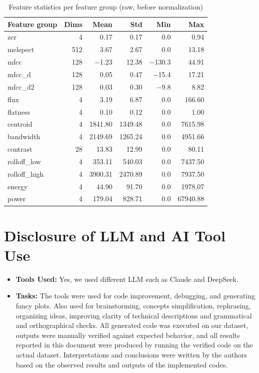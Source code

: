 \documentclass{article}
\begin{document}
\begin{table}[!h]
  \caption{Feature statistics per feature group (raw, before normalization)}
  \label{tab:featstats}
  \centering
  \small
  \begin{tabular}{lrrrrr}
    \toprule
    Feature group & Dims & Mean & Std & Min & Max \\
    \midrule
    zcr           &   4 & 0.17    & 0.17     & 0.0   & 0.94 \\
    melspect      & 512 & 3.67    & 2.67     & 0.0   & 13.18 \\
    mfcc          & 128 & $-$1.23 & 12.38    & $-$130.3 & 44.91 \\
    mfcc\_d       & 128 & 0.05    & 0.47     & $-$15.4 & 17.21 \\
    mfcc\_d2      & 128 & 0.03    & 0.30     & $-$9.8  & 8.82 \\
    flux          &   4 & 3.19    & 6.87     & 0.0   & 166.60 \\
    flatness      &   4 & 0.10    & 0.12     & 0.0   & 1.00 \\
    centroid      &   4 & 1841.80 & 1349.48  & 0.0   & 7615.98 \\
    bandwidth     &   4 & 2149.69 & 1265.24  & 0.0   & 4951.66 \\
    contrast      &  28 & 13.83   & 12.99    & 0.0   & 80.11 \\
    rolloff\_low  &   4 & 353.11  & 540.03   & 0.0   & 7437.50 \\
    rolloff\_high &   4 & 3900.31 & 2470.89  & 0.0   & 7937.50 \\
    energy        &   4 & 44.90   & 91.70    & 0.0   & 1978.07 \\
    power         &   4 & 179.04  & 828.71   & 0.0   & 67940.88 \\
    \bottomrule
  \end{tabular}
\end{table}
 


\clearpage
\section{Disclosure of LLM and AI Tool Use}
\begin{itemize}
    \item \textbf{Tools Used:} Yes, we used different LLM such as Claude and DeepSeek.
    \item \textbf{Tasks:} The tools were used for code improvement, debugging, and generating fancy plots. Also used for brainstorming, concepts simplification, rephrasing, organizing ideas, improving clarity of technical descriptions and grammatical and orthographical checks. 
All generated code was executed on our dataset, outputs were manually verified against expected behavior, and all results reported in this document were produced by running the verified code on the actual dataset. 
Interpretations and conclusions were written by the authors based on the observed results and outputs of the implemented codes.
\end{itemize}
\end{document}
